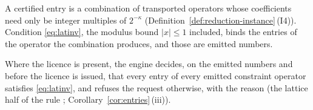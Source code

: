 
A certified entry is a combination of transported operators whose
coefficients need only be integer multiples of $2^{-\kappa}$
(Definition~\ref{def:reduction-instance}\,(I4)). Condition
\eqref{eq:latinv}, the modulus bound $|x|\le1$ included, binds the entries of
the operator the combination produces, and those are emitted numbers.

\begin{requirement}\label{req:licensed-entry-lattice}
Where the licence is present, the engine decides, on the emitted numbers and
before the licence is issued, that every entry of every emitted constraint
operator satisfies \eqref{eq:latinv}, and refuses the request
otherwise, with the reason  (the lattice
half of the rule ;
Corollary~\ref{cor:entries}\,(iii)).
\end{requirement}

